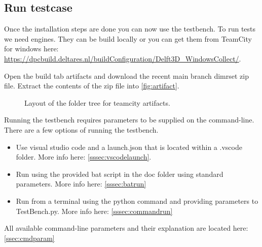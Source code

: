 \documentclass{deltares_memo}
\begin{document}
\subsection{Run testcase}
Once the installation steps are done you can now use the testbench. To run tests we need engines. They can be build locally or you can get them from TeamCity for windows here: \url{https://dpcbuild.deltares.nl/buildConfiguration/Delft3D_WindowsCollect/}.

Open the build tab artifacts and download the recent main branch dimrset zip file. Extract the contents of the zip file into  \autoref{fig:artifact}.
\begin{figure}[H]
\begin{minipage}[t]{0.45\textwidth}
\end{minipage}
\caption{Layout of the folder tree for teamcity artifacts.\label{fig:artifact}}
\end{figure}

Running the testbench requires parameters to be supplied on the command-line. There are a few options of running the testbench.
\begin{itemize}
\item Use visual studio code and a launch.json that is located within a .vscode folder. More info here: \autoref{sssec:vscodelaunch}.
\item Run using the provided bat script in the doc folder using standard parameters. More info here: \autoref{sssec:batrun}
\item Run from a terminal using the python command and providing parameters to TestBench.py. More info here: \autoref{sssec:commandrun}
\end{itemize}
All available command-line parameters and their explanation are located here: \autoref{ssec:cmdparam}
\end{document}
